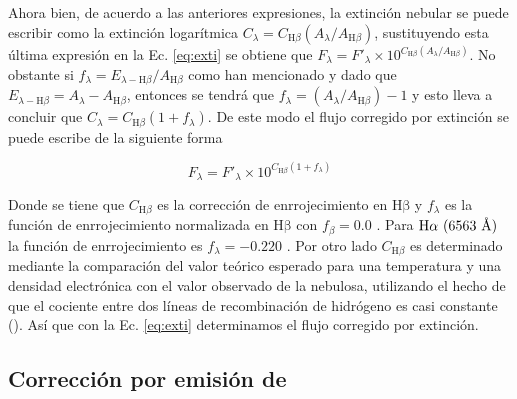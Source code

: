 Ahora bien, de acuerdo a las anteriores expresiones, la extinción nebular se puede escribir como la extinción logarítmica \(C_{\lambda} = C_{\text{H}\beta}(A_{\lambda}/A_{\text{H}\beta})\), sustituyendo esta última expresión en la Ec. \ref{eq:exti} se obtiene que  \(F_{\lambda} = F'_{\lambda}\times10^{C_{\text{H}\beta}(A_{\lambda}/A_{\text{H}\beta})}\). No obstante si  \(f_{\lambda}= E_{\lambda-\text{H}\beta}/A_{\text{H}\beta}\) como han mencionado \citet{Costero:1970} y dado que \(E_{\lambda-\text{H}\beta}=A_{\lambda}-A_{\text{H}\beta}\), entonces se tendrá que \(f_{\lambda} = (A_{\lambda}/A_{\text{H}\beta})-1\) y esto lleva a concluir que \(C_{\lambda}= C_{\text{H}\beta}(1+f_{\lambda})\). De este modo el flujo corregido por extinción se puede escribe de la siguiente forma

\begin{equation}
  \label{eq:flujo}
  F_{\lambda} = F'_{\lambda}\times10^{C_{\text{H}\beta}(1+f_{\lambda})}
\end{equation}

 Donde se tiene que \(C_{\text{H}\beta}\) es la corrección de enrrojecimiento en \(\mathrm{H\beta}\) y \(f_{\lambda}\) es la función de enrrojecimiento normalizada en \(\mathrm{H\beta}\) con \(f_{\beta}=0.0\) \citep{Peimbert:1977}. Para \(\mathrm{H}\alpha{}~(6563~\text{\AA{}}{})\) la función de enrrojecimiento es \(f_{\lambda} = -0.220\) \citep{Blagrave:2007}. Por otro lado \(C_{\text{H}\beta}\) es determinado mediante la comparación del valor teórico esperado para una temperatura y una densidad electrónica con el valor observado de la nebulosa, utilizando el hecho de que el cociente entre dos líneas de recombinación de hidrógeno es casi constante (\citeauthor{Peimbert:1977}). Así que con la Ec. \ref{eq:exti} determinamos el flujo corregido por extinción.

\subsection{Corrección por emisión de \nii{}}
\label{sec:comp}

